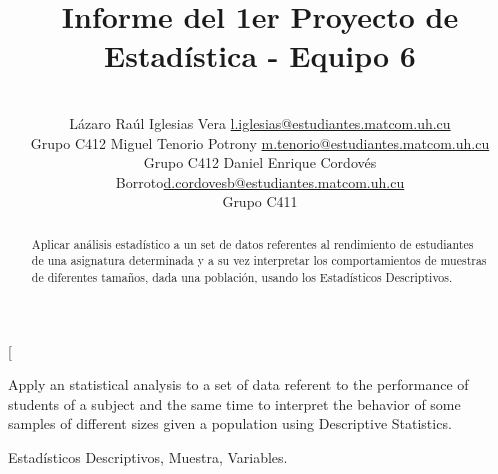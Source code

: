 \documentclass[a4paper,10pt,twocolumn]{article}
\title{Informe del 1er Proyecto de Estadística - Equipo 6}
\author{\\
\name Lázaro Raúl Iglesias Vera \email \href{mailto:l.iglesias@estudiantes.matcom.uh.cu}{l.iglesias@estudiantes.matcom.uh.cu}
\\ \addr Grupo C412 \AND
\name Miguel Tenorio Potrony \email \href{mailto:m.tenorio@estudiantes.matcom.uh.cu}{m.tenorio@estudiantes.matcom.uh.cu}
\\ \addr Grupo C412 \AND
\name Daniel Enrique Cordovés Borroto\email \href{mailto:d.cordovesb@estudiantes.matcom.uh.cu}{d.cordovesb@estudiantes.matcom.uh.cu}
\\ \addr Grupo C411}
\begin{document}
\twocolumn[

\maketitle


\begin{abstract}

	Aplicar análisis estadístico a un set de datos referentes al rendimiento de estudiantes de una asignatura determinada y a su vez interpretar los comportamientos de muestras de diferentes tamaños, dada una población, usando los Estadísticos Descriptivos.

\end{abstract}

\vspace{0.5cm}

\begin{enabstract}

  Apply an statistical analysis to a set of data referent to the performance of students of a subject and the same time to interpret the behavior of some samples of different sizes given a population using Descriptive Statistics.

\end{enabstract}

\begin{keywords}
	Estadísticos Descriptivos,
	Muestra,
	Variables.
\end{keywords}
\end{document}
